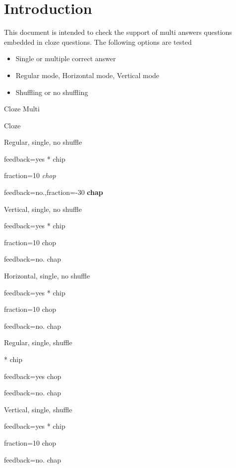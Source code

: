 \documentclass{article}
\begin{document}
\section*{Introduction}

This document is intended to check the support of multi answers questions 
embedded in cloze questions. The following options are tested
\begin{itemize}
	\item Single or multiple correct answer
	\item Regular mode, Horizontal mode, Vertical mode
	\item Shuffling or no shuffling
\end{itemize}

\begin{quiz}{Cloze Multi}

\begin{cloze}{Cloze}
\begin{multi}[shuffle=false]
Regular, single, no shuffle
\item[feedback={yes}]* chip 
\item[fraction=10] \textit{chop} 
\item[feedback={no.},fraction=-30] \textbf{chap}
\end{multi}

\begin{multi}[shuffle=false,vertical]
Vertical, single, no shuffle
\item[feedback={yes}]* chip
\item[fraction=10] chop
\item[feedback={no.}] chap
\end{multi}

\begin{multi}[shuffle=false,horizontal]
Horizontal, single, no shuffle
\item[feedback={yes}]* chip
\item[fraction=10] chop
\item[feedback={no.}] chap
\end{multi}

\begin{multi}[shuffle=true]
	Regular, single, shuffle
	\item[]* chip
	\item[feedback={yes}] chop
	\item[feedback={no.}] chap
\end{multi}

\begin{multi}[shuffle=true,vertical]
	Vertical, single, shuffle
	\item[feedback={yes}]* chip
	\item[fraction=10] chop
	\item[feedback={no.}] chap
\end{multi}


\end{cloze}
\end{quiz}
\end{document}
